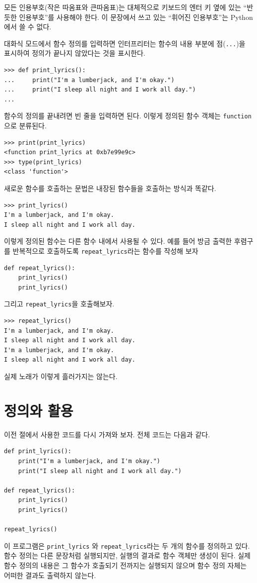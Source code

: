 \documentclass[10pt]{book}
\begin{document}
모든 인용부호(작은 따옴표와 큰따옴표)는 대체적으로 키보드의 엔터 키
옆에 있는 ``반듯한 인용부호''를 사용해야 한다.  이 문장에서 쓰고 있는
``휘어진 인용부호''는 Python에서 쓸 수 없다.

대화식 모드에서 함수 정의를 입력하면 인터프리터는 함수의 내용 부분에
점({\tt ...})을 표시하여 정의가 끝나지 않았다는 것을 표시한다.

\begin{verbatim}
>>> def print_lyrics():
...     print("I'm a lumberjack, and I'm okay.")
...     print("I sleep all night and I work all day.")
...
\end{verbatim}
%
함수의 정의를 끝내려면 빈 줄을 입력하면 된다.  이렇게 정의된 함수 객체는
\verb"function"으로 분류된다.

\begin{verbatim}
>>> print(print_lyrics)
<function print_lyrics at 0xb7e99e9c>
>>> type(print_lyrics)
<class 'function'>
\end{verbatim}
%
새로운 함수를 호출하는 문법은 내장된 함수들을 호출하는 방식과 똑같다. 

\begin{verbatim}
>>> print_lyrics()
I'm a lumberjack, and I'm okay.
I sleep all night and I work all day.
\end{verbatim}
%
이렇게 정의된 함수는 다른 함수 내에서 사용될 수 있다.  예를 들어 방금
출력한 후렴구를 반복적으로 호출하도록 \verb"repeat_lyrics"라는 함수를
작성해 보자


\begin{verbatim}
def repeat_lyrics():
    print_lyrics()
    print_lyrics()
\end{verbatim}
%
그리고 \verb"repeat_lyrics"을 호출해보자.

\begin{verbatim}
>>> repeat_lyrics()
I'm a lumberjack, and I'm okay.
I sleep all night and I work all day.
I'm a lumberjack, and I'm okay.
I sleep all night and I work all day.
\end{verbatim}
%
실제 노래가 이렇게 흘러가지는 않는다.


\section{정의와 활용}

이전 절에서 사용한 코드를 다시 가져와 보자.  전체 코드는 다음과 같다. 

\begin{verbatim}
def print_lyrics():
    print("I'm a lumberjack, and I'm okay.")
    print("I sleep all night and I work all day.")

def repeat_lyrics():
    print_lyrics()
    print_lyrics()

repeat_lyrics()
\end{verbatim}
%
이 프로그램은 \verb"print_lyrics" 와 \verb"repeat_lyrics"라는 두 개의
함수를 정의하고 있다.  함수 정의는 다른 문장처럼 실행되지만, 실행의
결과로 함수 객체만 생성이 된다. 실제 함수 정의의 내용은 그 함수가
호출되기 전까지는 실행되지 않으며 함수 정의 자체는 어떠한 결과도 출력하지 않는다.
\end{document}
